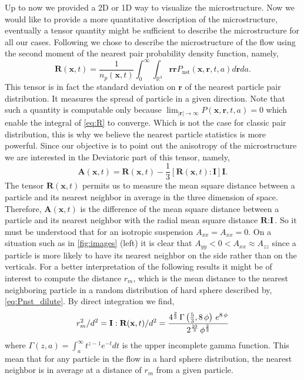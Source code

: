 Up to now we provided a 2D or 1D way to visualize the microstructure. 
Now we would like to provide a more quantitative description of the microstructure, eventually a tensor quantity might be sufficient to describe the microstructure for all our cases. 
Following \citet{zhang2023evolution} we chose to describe the microstructure of the flow using the second moment of the nearest pair probability density function, namely,
\begin{equation}
    \textbf{R}(\textbf{x},t) =\frac{1}{n_p(\textbf{x},t)} 
    \int_0^\infty 
    \int_{\mathbb{R}^3} \textbf{rr} P_\text{nst}(\textbf{x},\textbf{r},t,a) d\textbf{r} da.
    \label{eq:R}
\end{equation}
This tensor is in fact the standard deviation on $\textbf{r}$ of the nearest particle pair distribution. 
It measures the spread of particle in a given direction. 
Note that such a quantity is computable only because $\lim_{|\textbf{r}|\to \infty} P(\textbf{x},\textbf{r},t,a) = 0$ which enable the integral of \ref{eq:R} to converge. 
Which is not the case for classic pair distribution, this is why we believe the nearest particle statistics is more powerful. 
Since our objective is to point out the anisotropy of the microstructure we are interested in the Deviatoric part of this tensor, namely, 
\begin{equation*}
    \textbf{A}(\textbf{x},t) = \textbf{R}(\textbf{x},t) - \frac{1}{3} [\textbf{R}(\textbf{x},t) : \textbf{I}] \textbf{I}.
\end{equation*}
The tensor $\textbf{R}(\textbf{x},t)$ permits us to measure the mean square distance between a particle and its nearest neighbor in average in the three dimension of space. 
Therefore, $\textbf{A}(\textbf{x},t)$ is the difference of the mean square distance between a particle and its nearest neighbor with the radial mean square distance $\textbf{R}:\textbf{I}$. 
So it must be understood that for an isotropic suspension $A_{xx} = A_{xx} = 0$. 
On a situation such as in \ref{fig:images} (left) it is clear that $A_{yy} < 0 < A_{xx}\approx A_{zz}$ since a particle is more likely to have its nearest neighbor on the side rather than on the verticals. 
For a better interpretation of the following results it might be of interest to compute the distance $r_m$, which is the mean distance to the nearest neighboring particle in a random distribution of hard sphere described by, \ref{eq:Pnst_dilute}. 
By direct integration we find, 
\begin{equation*}
    r_m^2 /d^2
    = \textbf{I}:\textbf{R}(\textbf{x},t)/d^2
    = {{4^{{{2}\over{3}}}\,\Gamma\left({{5}\over{3}} , 8\,\phi\right)
    \,e^{8\,\phi}}\over{2^{{{10}\over{3}}}\,\phi^{{{2}\over{3}}}}}
\end{equation*}
where $\Gamma(z,a) = \int_a^\infty t^{z-1} e^{-t} dt$ is the upper incomplete gamma function. 
This mean that for any particle in the flow in a hard sphere distribution, the nearest neighbor is in average at a distance of $r_m$ from a given particle.  

